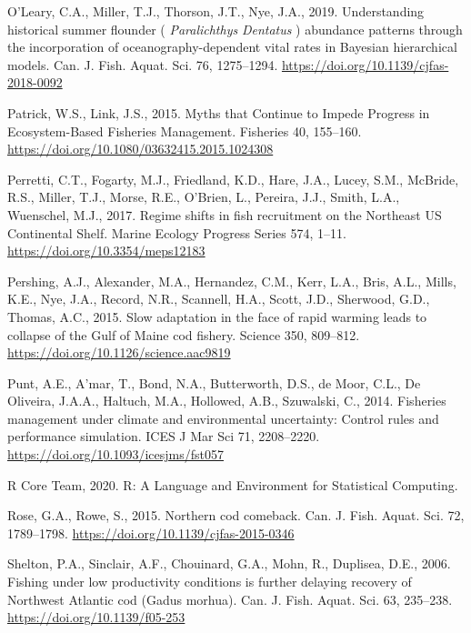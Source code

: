 \documentclass[]{article}
\begin{document}
\leavevmode\hypertarget{ref-oleary2019Understanding}{}%
O'Leary, C.A., Miller, T.J., Thorson, J.T., Nye, J.A., 2019.
Understanding historical summer flounder ( \emph{Paralichthys}
\emph{Dentatus} ) abundance patterns through the incorporation of
oceanography-dependent vital rates in Bayesian hierarchical models. Can.
J. Fish. Aquat. Sci. 76, 1275--1294.
\url{https://doi.org/10.1139/cjfas-2018-0092}

\leavevmode\hypertarget{ref-patrick2015Myths}{}%
Patrick, W.S., Link, J.S., 2015. Myths that Continue to Impede Progress
in Ecosystem-Based Fisheries Management. Fisheries 40, 155--160.
\url{https://doi.org/10.1080/03632415.2015.1024308}

\leavevmode\hypertarget{ref-perretti2017Regime}{}%
Perretti, C.T., Fogarty, M.J., Friedland, K.D., Hare, J.A., Lucey, S.M.,
McBride, R.S., Miller, T.J., Morse, R.E., O'Brien, L., Pereira, J.J.,
Smith, L.A., Wuenschel, M.J., 2017. Regime shifts in fish recruitment on
the Northeast US Continental Shelf. Marine Ecology Progress Series 574,
1--11. \url{https://doi.org/10.3354/meps12183}

\leavevmode\hypertarget{ref-pershing2015Slow}{}%
Pershing, A.J., Alexander, M.A., Hernandez, C.M., Kerr, L.A., Bris,
A.L., Mills, K.E., Nye, J.A., Record, N.R., Scannell, H.A., Scott, J.D.,
Sherwood, G.D., Thomas, A.C., 2015. Slow adaptation in the face of rapid
warming leads to collapse of the Gulf of Maine cod fishery. Science 350,
809--812. \url{https://doi.org/10.1126/science.aac9819}

\leavevmode\hypertarget{ref-punt2014Fisheries}{}%
Punt, A.E., A'mar, T., Bond, N.A., Butterworth, D.S., de Moor, C.L., De
Oliveira, J.A.A., Haltuch, M.A., Hollowed, A.B., Szuwalski, C., 2014.
Fisheries management under climate and environmental uncertainty:
Control rules and performance simulation. ICES J Mar Sci 71, 2208--2220.
\url{https://doi.org/10.1093/icesjms/fst057}

\leavevmode\hypertarget{ref-rcoreteam2020Language}{}%
R Core Team, 2020. R: A Language and Environment for Statistical
Computing.

\leavevmode\hypertarget{ref-rose2015Northern}{}%
Rose, G.A., Rowe, S., 2015. Northern cod comeback. Can. J. Fish. Aquat.
Sci. 72, 1789--1798. \url{https://doi.org/10.1139/cjfas-2015-0346}

\leavevmode\hypertarget{ref-shelton2006Fishing}{}%
Shelton, P.A., Sinclair, A.F., Chouinard, G.A., Mohn, R., Duplisea,
D.E., 2006. Fishing under low productivity conditions is further
delaying recovery of Northwest Atlantic cod (Gadus morhua). Can. J.
Fish. Aquat. Sci. 63, 235--238. \url{https://doi.org/10.1139/f05-253}
\end{document}
